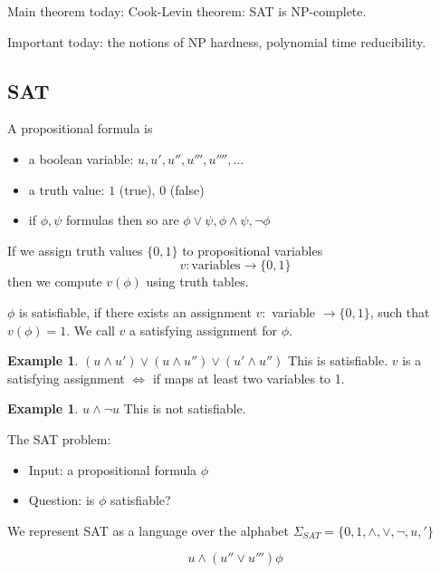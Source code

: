 \documentclass[a4paper,12pt]{article}
\theoremstyle{definition}
\newtheorem{example}[counter]{Example}
\theoremstyle{remark}
\begin{document}
Main theorem today: Cook-Levin theorem: SAT is NP-complete.

Important today: the notions of NP hardness, polynomial time reducibility.

\subsection{SAT}

A propositional formula is
\begin{itemize}
    \item a boolean variable: $u, u', u'', u''', u'''', ...$
    \item a truth value: $1$ (true), $0$ (false)
    \item if $\phi, \psi$ formulas then so are $\phi \lor\psi, \phi \land \psi, \neg \phi$
\end{itemize}

If we assign truth values $\{0, 1\}$ to propositional variables
\begin{equation*}
    v: \text{variables} \to \{0, 1\}
\end{equation*}
then we compute $v(\phi)$ using truth tables.

$\phi$ is satisfiable, if there exists an assignment $v:$ variable $\to \{0, 1\}$, such that $v(\phi) = 1$.
We call $v$ a satisfying assignment for $\phi$.

\begin{example}
    $(u \land u') \lor (u \land u'') \lor (u' \land u'')$
    This is satisfiable. $v$ is a satisfying assignment $\iff$ if maps at least two variables to 1.
\end{example}

\begin{example}
    $u \land \neg u$
    This is not satisfiable.
\end{example}

The SAT problem:
\begin{itemize}
    \item Input: a propositional formula $\phi$
    \item Question: is $\phi$ satisfiable?
\end{itemize}

We represent SAT as a language over the alphabet $\Sigma_{SAT} = \{0, 1, \land, \lor, \neg, u, '\}$

\begin{equation*}
    u \land (u'' \lor u''') \phi
\end{equation*}
\end{document}
